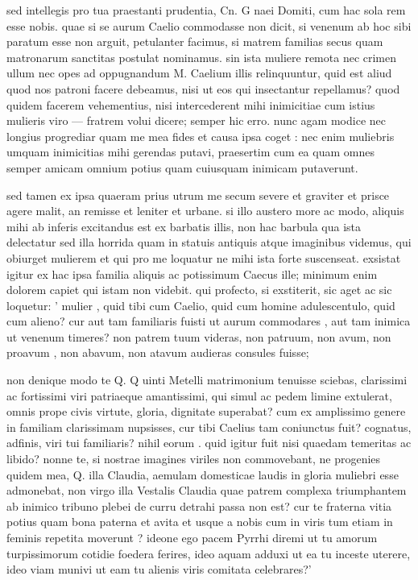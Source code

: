  sed intellegis pro tua praestanti prudentia, Cn. G naei Domiti, cum hac sola rem esse nobis. quae si se aurum Caelio commodasse non dicit, si venenum ab hoc sibi paratum esse non arguit, petulanter facimus, si matrem familias secus quam matronarum sanctitas postulat nominamus. sin ista muliere remota nec crimen ullum nec opes ad oppugnandum M. Caelium illis relinquuntur, quid est aliud quod nos patroni facere debeamus, nisi ut eos qui insectantur repellamus? quod quidem facerem vehementius, nisi intercederent mihi inimicitiae cum istius mulieris viro — fratrem volui dicere; semper hic erro. nunc agam modice nec longius progrediar quam me mea fides et causa ipsa coget : nec enim muliebris umquam inimicitias mihi gerendas putavi, praesertim cum ea quam omnes semper amicam omnium potius quam cuiusquam inimicam putaverunt.

 sed tamen ex ipsa quaeram prius utrum me secum severe et graviter et prisce agere malit, an remisse et leniter et urbane. si illo austero more ac modo, aliquis mihi ab inferis excitandus est ex barbatis illis, non hac barbula qua ista delectatur sed illa horrida quam in statuis antiquis atque imaginibus videmus, qui obiurget mulierem et qui pro me loquatur ne mihi ista forte suscenseat. exsistat igitur ex hac ipsa familia aliquis ac potissimum Caecus ille; minimum enim dolorem capiet qui istam non videbit. qui profecto, si exstiterit, sic aget ac sic loquetur: ' mulier , quid tibi cum Caelio, quid cum homine adulescentulo, quid cum alieno? cur aut tam familiaris fuisti ut aurum commodares , aut tam inimica ut venenum timeres? non patrem tuum videras, non patruum, non avum, non proavum , non abavum, non atavum audieras consules fuisse;

 non denique modo te Q. Q uinti Metelli matrimonium tenuisse sciebas, clarissimi ac fortissimi viri patriaeque amantissimi, qui simul ac pedem limine extulerat, omnis prope civis virtute, gloria, dignitate superabat? cum ex amplissimo genere in familiam clarissimam nupsisses, cur tibi Caelius tam coniunctus fuit? cognatus, adfinis, viri tui familiaris? nihil eorum . quid igitur fuit nisi quaedam temeritas ac libido? nonne te, si nostrae imagines viriles non commovebant, ne progenies quidem mea, Q. illa Claudia, aemulam domesticae laudis in gloria muliebri esse admonebat, non virgo illa Vestalis Claudia quae patrem complexa triumphantem ab inimico tribuno plebei de curru detrahi passa non est? cur te fraterna vitia potius quam bona paterna et avita et usque a nobis cum in viris tum etiam in feminis repetita moverunt ? ideone ego pacem Pyrrhi diremi ut tu amorum turpissimorum cotidie foedera ferires, ideo aquam adduxi ut ea tu inceste uterere, ideo viam munivi ut eam tu alienis viris comitata celebrares?'


